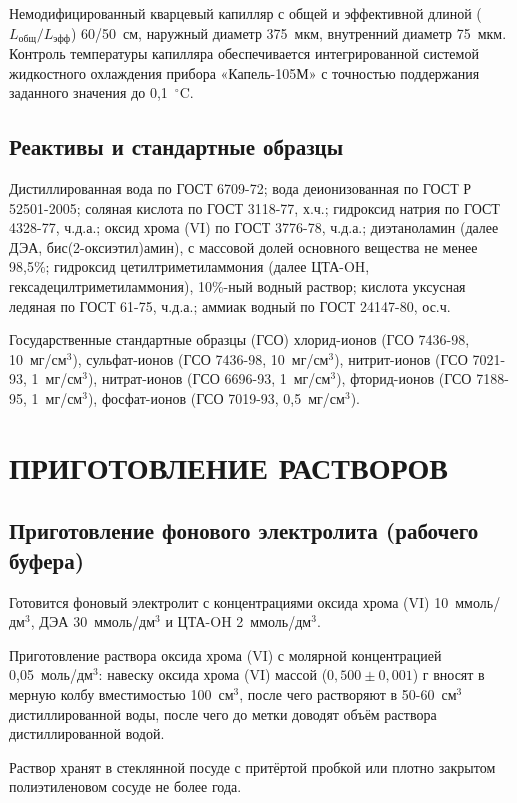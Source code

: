 Немодифицированный кварцевый капилляр с общей и эффективной длиной ($L_{\text{общ}}/L_{\text{эфф}}$) 60/50~см, наружный диаметр 375~мкм, внутренний диаметр 75~мкм. Контроль температуры капилляра обеспечивается интегрированной системой жидкостного охлаждения прибора «Капель-105М» с точностью поддержания заданного значения до 0,1~$^\circ$C.

\subsection{Реактивы и стандартные образцы}

Дистиллированная вода по ГОСТ 6709-72; вода деионизованная по ГОСТ Р 52501-2005; соляная кислота по ГОСТ 3118-77, х.ч.; гидроксид натрия по ГОСТ 4328-77, ч.д.а.; оксид хрома (VI) по ГОСТ 3776-78, ч.д.а.; диэтаноламин (далее ДЭА, бис(2-оксиэтил)амин), с массовой долей основного вещества не менее 98,5\%; гидроксид цетилтриметиламмония (далее ЦТА-OH, гексадецилтриметиламмония), 10\%-ный водный раствор; кислота уксусная ледяная по ГОСТ 61-75, ч.д.а.; аммиак водный по ГОСТ 24147-80, ос.ч.

Государственные стандартные образцы (ГСО) хлорид-ионов (ГСО 7436-98, 10~мг/см$^3$), сульфат-ионов (ГСО 7436-98, 10~мг/см$^3$), нитрит-ионов (ГСО 7021-93, 1~мг/см$^3$), нитрат-ионов (ГСО 6696-93, 1~мг/см$^3$), фторид-ионов (ГСО 7188-95, 1~мг/см$^3$), фосфат-ионов (ГСО 7019-93, 0,5~мг/см$^3$).

\section{ПРИГОТОВЛЕНИЕ РАСТВОРОВ}

\subsection{Приготовление фонового электролита (рабочего буфера)}

Готовится фоновый электролит с концентрациями оксида хрома (VI) 10~ммоль/дм$^3$, ДЭА 30~ммоль/дм$^3$ и ЦТА-OH 2~ммоль/дм$^3$.

Приготовление раствора оксида хрома (VI) с молярной концентрацией 0,05~моль/дм$^3$: навеску оксида хрома (VI) массой ($0{,}500 \pm 0{,}001$) г вносят в мерную колбу вместимостью 100~см$^3$, после чего растворяют в 50-60~см$^3$ дистиллированной воды, после чего до метки доводят объём раствора дистиллированной водой.

Раствор хранят в стеклянной посуде с притёртой пробкой или плотно закрытом полиэтиленовом сосуде не более года.

